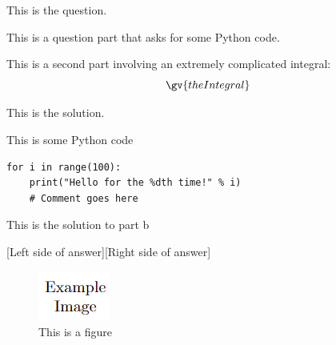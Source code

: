 
This is the question.
\begin{alpQ}
	\item This is a question part that asks for some Python code.
	\item This is a second part involving an extremely complicated integral:
	\[\gv{theIntegral}\]
\end{alpQ}

\midsep

\begin{solution}

	This is the solution.
	\begin{alpQ}
		\item This is some Python code
		\begin{verbatim}
for i in range(100):
	print("Hello for the %dth time!" % i)
	# Comment goes here
		\end{verbatim}
		\item This is the solution to part b
		
		\lsplit{
			\[\gv{theIntegral} = 1 \]
		}
		{
		}
		[Left side of answer][Right side of answer]
		
	\end{alpQ}
	
	\begin{figure}[h]
		\centering
		\includegraphics{example image.png}
		\caption{This is a figure}
		\label{fig:example figure}
	\end{figure}
	
\end{solution}